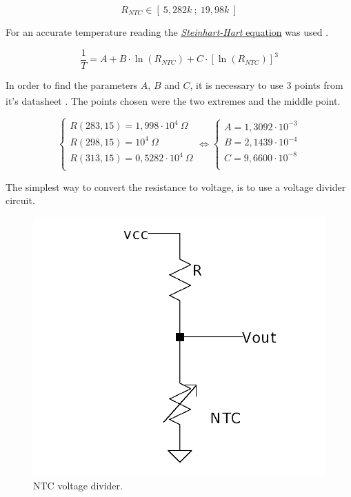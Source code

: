 \documentclass[12pt]{article}
\begin{document}
    $$R_{NTC} \in [~5,282k~;~19,98k~]$$

    For an accurate temperature reading the 
    \hyperref[eq:1]{ \textit{Steinhart-Hart} equation} was used .

    \begin{equation} \label{eq:1}
    \frac{1}{T} = A + B\cdot \ln(R_{NTC}) + C\cdot [\ln(R_{NTC})]^3
    \end{equation}

    In order to find the parameters $A$, $B$ and $C$, it is necessary to use 3 points from it's datasheet \textsuperscript{\cite{NTC_datasheet}}. 
    The points chosen were the two extremes and the middle point.
    
    \begin{equation}
        \begin{cases}
        
            R( 283,15 ) = 1,998\cdot 10^4 ~\Omega \\
            R( 298,15 ) = 10^4 ~\Omega\\
            R( 313,15 ) = 0,5282 \cdot 10^4 ~\Omega\\
        
        \end{cases}
        \Leftrightarrow
        \begin{cases}
            A = 1,3092 \cdot 10^{-3}\\
            B = 2,1439 \cdot 10^{-4}\\
            C = 9,6600 \cdot 10^{-8}\\
        
        \end{cases}
    \end{equation}

    The simplest way to convert the resistance to voltage, is to use a voltage divider circuit.

   \begin{figure}[H] 
        \centering
        \includegraphics*[scale = 0.25]{images/voltagedivider.png}
        \caption{NTC voltage divider.}
        \label{wrap-fig:1}
    \end{figure}
\end{document}
